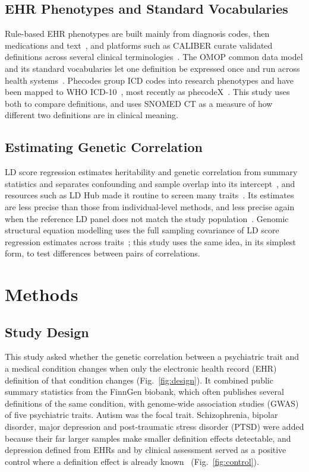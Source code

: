 \documentclass[conference]{IEEEtran}
\begin{document}
\subsection{EHR Phenotypes and Standard Vocabularies}
Rule-based EHR phenotypes are built mainly from diagnosis codes, then medications and text~\cite{kirby2016}, and platforms such as CALIBER curate validated definitions across several clinical terminologies~\cite{denaxas2019}. The OMOP common data model and its standard vocabularies let one definition be expressed once and run across health systems~\cite{overhage2012,hripcsak2015}. Phecodes group ICD codes into research phenotypes and have been mapped to WHO ICD-10~\cite{wu2019}, most recently as phecodeX~\cite{shuey2023}. This study uses both to compare definitions, and uses SNOMED CT as a measure of how different two definitions are in clinical meaning.

\subsection{Estimating Genetic Correlation}
LD score regression estimates heritability and genetic correlation from summary statistics and separates confounding and sample overlap into its intercept~\cite{bulik2015ldsc,bulik2015atlas}, and resources such as LD Hub made it routine to screen many traits~\cite{zheng2017}. Its estimates are less precise than those from individual-level methods, and less precise again when the reference LD panel does not match the study population~\cite{ni2018}. Genomic structural equation modelling uses the full sampling covariance of LD score regression estimates across traits~\cite{grotzinger2019}; this study uses the same idea, in its simplest form, to test differences between pairs of correlations.

\section{Methods}

\subsection{Study Design}


This study asked whether the genetic correlation between a psychiatric trait and a medical condition changes when only the electronic health record (EHR) definition of that condition changes (Fig.~\ref{fig:design}). It combined public summary statistics from the FinnGen biobank, which often publishes several definitions of the same condition, with genome-wide association studies (GWAS) of five psychiatric traits. Autism was the focal trait. Schizophrenia, bipolar disorder, major depression and post-traumatic stress disorder (PTSD) were added because their far larger samples make smaller definition effects detectable, and depression defined from EHRs and by clinical assessment served as a positive control where a definition effect is already known~\cite{cai2020} (Fig.~\ref{fig:control}).
\end{document}
